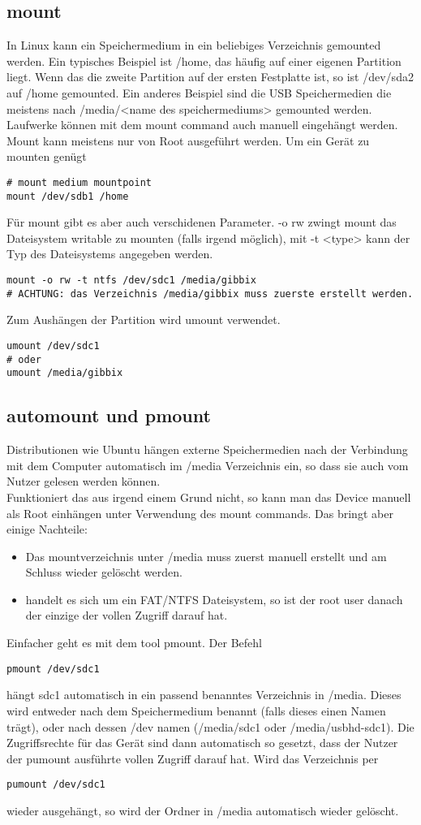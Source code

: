 \subsection{mount}
In Linux kann ein Speichermedium in ein beliebiges Verzeichnis gemounted werden. Ein typisches Beispiel ist /home, das h\"aufig auf einer eigenen Partition liegt. Wenn das die zweite Partition auf der ersten Festplatte ist, so ist /dev/sda2 auf /home gemounted. Ein anderes Beispiel sind die USB Speichermedien die meistens nach /media/<name des speichermediums> gemounted werden.\\
Laufwerke k\"onnen mit dem mount command auch manuell eingeh\"angt werden. Mount kann meistens nur von Root ausgef\"uhrt werden. Um ein Ger\"at zu mounten gen\"ugt
\begin{lstlisting}
# mount medium mountpoint
mount /dev/sdb1 /home
\end{lstlisting}
F\"ur mount gibt es aber auch verschidenen Parameter. -o rw zwingt mount das Dateisystem writable zu mounten (falls irgend m\"oglich), mit -t <type> kann der Typ des Dateisystems angegeben werden.
\begin{lstlisting}
mount -o rw -t ntfs /dev/sdc1 /media/gibbix
# ACHTUNG: das Verzeichnis /media/gibbix muss zuerste erstellt werden.
\end{lstlisting}
Zum Aush\"angen der Partition wird umount verwendet.
\begin{lstlisting}
umount /dev/sdc1
# oder
umount /media/gibbix
\end{lstlisting}
\subsection{automount und pmount}
Distributionen wie Ubuntu h\"angen externe Speichermedien nach der Verbindung mit dem Computer automatisch im /media Verzeichnis ein, so dass sie auch vom Nutzer gelesen werden k\"onnen.\\
Funktioniert das aus irgend einem Grund nicht, so kann man das Device manuell als Root einh\"angen unter Verwendung des mount commands. Das bringt aber einige Nachteile:
\begin{itemize}
\item Das mountverzeichnis unter /media muss zuerst manuell erstellt und am Schluss wieder gel\"oscht werden.
\item handelt es sich um ein FAT/NTFS Dateisystem, so ist der root user danach der einzige der vollen Zugriff darauf hat.
\end{itemize}
Einfacher geht es mit dem tool pmount. Der Befehl
\begin{lstlisting}
pmount /dev/sdc1
\end{lstlisting}
h\"angt sdc1 automatisch in ein passend benanntes Verzeichnis in /media. Dieses wird entweder nach dem Speichermedium benannt (falls dieses einen Namen tr\"agt), oder nach dessen /dev namen (/media/sdc1 oder /media/usbhd-sdc1). Die Zugriffsrechte f\"ur das Ger\"at sind dann automatisch so gesetzt, dass der Nutzer der pumount ausf\"uhrte vollen Zugriff darauf hat. Wird das Verzeichnis per
\begin{lstlisting}
pumount /dev/sdc1
\end{lstlisting}
wieder ausgeh\"angt, so wird der Ordner in /media automatisch wieder gel\"oscht.
